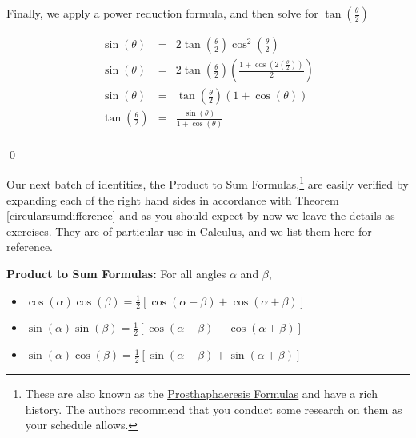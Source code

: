 \documentclass{ximera}
\begin{document}
\begin{example}
\begin{enumerate}
Finally, we apply a power reduction formula, and then solve for $\tan\left( \frac{\theta}{2} \right)$


\[ \begin{array}{rcl} 
\sin(\theta) & = & 2 \tan\left(\frac{\theta}{2}\right) \cos^{2}\left(\frac{\theta}{2}\right) \\   
\sin(\theta) & = & 2 \tan\left(\frac{\theta}{2}\right) \left( \frac{1 + \cos\left(2 \left(\frac{\theta}{2}\right)\right)}{2}\right) \\  
\sin(\theta) & = &  \tan\left(\frac{\theta}{2}\right) \left(1+\cos(\theta) \right) \\  
\tan\left( \frac{\theta}{2}\right) & = &  \frac{\sin(\theta)}{1+\cos(\theta)} \\  \end{array}  \]

\qed

\end{enumerate}

\end{example}


Our next batch of identities, the Product to Sum Formulas,\footnote{These are also known as the \href{https://en.wikipedia.org/wiki/Prosthaphaeresis}{\underline{Prosthaphaeresis Formulas}} and have a rich history.  The authors recommend that you conduct some research on them as your schedule allows.} are easily verified by expanding each of the right hand sides in accordance with Theorem \ref{circularsumdifference} and as you should expect by now we leave the details as exercises.  They are of particular use in Calculus, and we list them here for reference.

 


\begin{theorem} \label{producttosum}  \textbf{Product to Sum Formulas:} For all angles $\alpha$ and $\beta$, 

\begin{itemize}

\item  $\cos(\alpha)\cos(\beta) = \frac{1}{2} \left[ \cos(\alpha - \beta) + \cos(\alpha + \beta)\right]$

\item  $\sin(\alpha)\sin(\beta) = \frac{1}{2} \left[ \cos(\alpha - \beta) - \cos(\alpha + \beta)\right]$

\item  $\sin(\alpha)\cos(\beta) = \frac{1}{2} \left[ \sin(\alpha - \beta) + \sin(\alpha + \beta)\right]$

\end{itemize}

\end{theorem}
\end{document}
